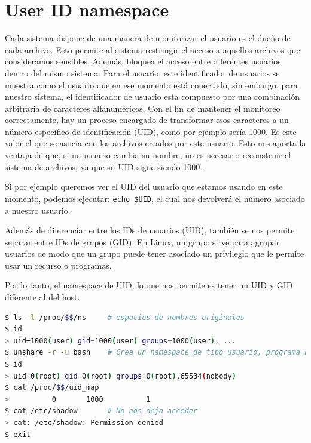 \documentclass[a4paper, oneside, 12pt]{book}
\begin{document}
	\pagebreak
	
	\section{User ID namespace}
	\par \noindent Cada sistema dispone de una manera de monitorizar el usuario es el dueño de cada archivo. Esto permite al sistema restringir el acceso a aquellos archivos que consideramos sensibles. Además, bloquea el acceso entre diferentes usuarios dentro del mismo sistema. Para el usuario, este identificador de usuarios se muestra como el usuario que en ese momento está conectado, sin embargo, para nuestro sistema, el identificador de usuario esta compuesto por una combinación arbitraria de caracteres alfanuméricos. Con el fin de mantener el monitoreo correctamente, hay un proceso encargado de transformar esos caracteres a un número específico de identificación (UID), como por ejemplo sería 1000. Es este valor el que se asocia con los archivos creados por este usuario. Esto nos aporta la ventaja de que, si un usuario cambia su nombre, no es necesario reconstruir el sistema de archivos, ya que su UID sigue siendo 1000.\\
	
	\par \noindent Si por ejemplo queremos ver el UID del usuario que estamos usando en este momento, podemos ejecutar: \texttt{echo \$UID}, el cual nos devolverá el número asociado a nuestro usuario. \\
	
	\par \noindent Además de diferenciar entre los IDs de usuarios (UID), también se nos permite separar entre IDs de grupos (GID). En Linux, un grupo sirve para agrupar usuarios de modo que un grupo puede tener asociado un privilegio que le permite usar un recurso o programas.\\
	
	\par \noindent Por lo tanto, el namespace de UID, lo que nos permite es tener un UID y GID diferente al del host. 
	
	\begin{lstlisting}[language=bash, caption=Ejemplo de uso UID namespace]
$ ls -l /proc/$$/ns		# espacios de nombres originales
$ id
> uid=1000(user) gid=1000(user) groups=1000(user), ...
$ unshare -r -u bash	# Crea un namespace de tipo usuario, programa bash
$ id
> uid=0(root) gid=0(root) groups=0(root),65534(nobody)
$ cat /proc/$$/uid_map
>          0       1000          1
$ cat /etc/shadow		# No nos deja acceder
> cat: /etc/shadow: Permission denied
$ exit
	\end{lstlisting}
	
\end{document}
